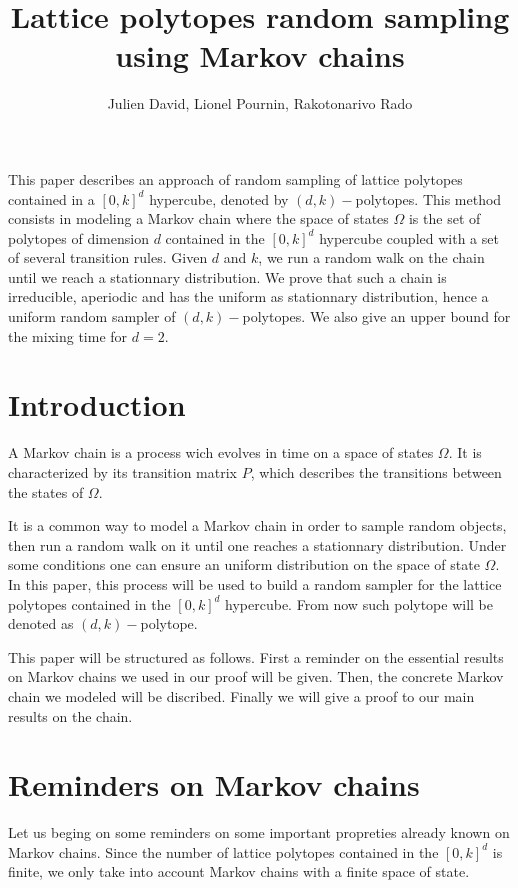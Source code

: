 \documentclass[11pt]{article}
\begin{document}
\title{Lattice polytopes random sampling using Markov chains}
\author{Julien David, Lionel Pournin, Rakotonarivo Rado}
\maketitle

 This paper describes an approach of random sampling of lattice polytopes contained in a $[0,k]^d$ hypercube, denoted by $(d,k)-$polytopes. This method consists in modeling a Markov chain where the space of states $\Omega$ is the set of polytopes of dimension $d$ contained in the $[0,k]^d$ hypercube coupled with a set of several transition rules. Given $d$ and $k$, we run a random walk on the chain until we reach a stationnary distribution. We prove that such a chain is irreducible, aperiodic and has the uniform as stationnary distribution, hence a uniform random sampler of $(d,k)-$polytopes. We also give an upper bound for the mixing time for $d = 2$.

\section{Introduction}

A Markov chain is a process wich evolves in time on a space of states $\Omega$. It is characterized by its transition matrix $P$, which describes the transitions between the states of $\Omega$.

It is a common way to model a Markov chain in order to sample random objects, then run a random walk on it until one reaches a stationnary distribution. Under some conditions one can ensure an uniform distribution on the space of state $\Omega$. In this paper, this process will be used to build a random sampler for the lattice polytopes contained in the $[0,k]^d$ hypercube. From now such polytope will be denoted as $(d,k)-$polytope.

This paper will be structured as follows. First a reminder on the essential results on Markov chains we used in our proof will be given. Then, the concrete Markov chain we modeled will be discribed. Finally we will give a proof to our main results on the chain.

\section{Reminders on Markov chains}

Let us beging on some reminders on some important propreties already known on Markov chains. Since the number of lattice polytopes contained in the $[0,k]^d$ is finite, we only take into account Markov chains with a finite space of state.
\end{document}
